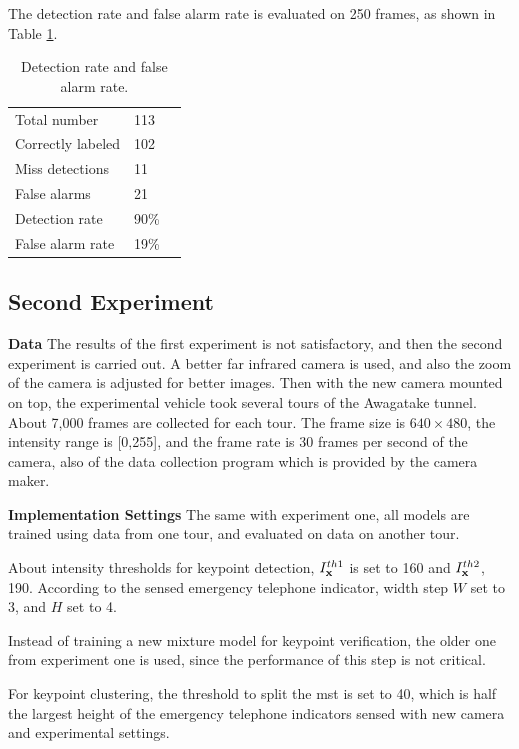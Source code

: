 The detection rate and false alarm rate is evaluated on 250 frames, as shown in Table \ref{ex1:tb2}.

\begin{table}[h]
\centering
\begin{tabular}{lll}
     \hline
     \hline
    Total number &	113   \\
    Correctly labeled &	102   \\
    Miss detections &	11 &	  \\
    False alarms &	21    \\
    Detection rate &	90\% &	  \\
    False alarm rate &	19\% &	   \\
   \hline
\end{tabular}
\caption{Detection rate and false alarm rate.}\label{ex1:tb2}
\end{table}

\subsection{Second Experiment}



\textbf{Data} The results of the first experiment is not satisfactory, and then the second experiment is carried out. A better far infrared camera is used, and also the zoom of the camera is adjusted for better images. Then with the new camera mounted on top, the experimental vehicle took several tours of the Awagatake tunnel. About 7,000 frames are collected for each tour. The frame size is $640\times 480$, the intensity range is [0,255], and the frame rate is 30 frames per second of the camera, also of the data collection program which is provided by the camera maker.

\textbf{Implementation Settings} The same with experiment one, all models are trained using data from one tour, and evaluated on data on another tour.

About intensity thresholds for keypoint detection, $I^{th1}_{\bf{x}}$ is set to 160 and $I^{th2}_{\bf{x}}$, 190. According to the sensed emergency telephone indicator, width step $W$ set to 3, and $H$ set to 4.

Instead of training a new mixture model for keypoint verification, the older one from experiment one is used, since the performance of this step is not critical.

For keypoint clustering, the threshold to split the mst is set to 40, which is half the largest height of the emergency telephone indicators sensed with new camera and experimental settings.

